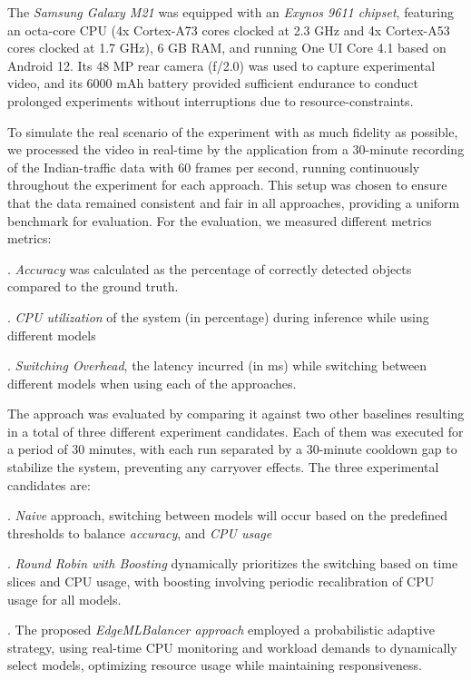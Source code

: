 The \textit{Samsung Galaxy M21} was equipped with an \textit{Exynos 9611 chipset}, featuring an octa-core CPU (4x Cortex-A73 cores clocked at 2.3 GHz and 4x Cortex-A53 cores clocked at 1.7 GHz), 6 GB RAM, and running One UI Core 4.1 based on Android 12. Its 48 MP rear camera (f/2.0) was used to capture experimental video, and its 6000 mAh battery provided sufficient endurance to conduct prolonged experiments without interruptions due to resource-constraints.

To simulate the real scenario of the experiment with as much fidelity as possible, we processed the video in real-time by the application from a 30-minute recording of the Indian-traffic data with 60 frames per second, running continuously throughout the experiment for each approach. This setup was chosen to ensure that the data remained consistent and fair in all approaches, providing a uniform benchmark for evaluation. For the evaluation, we measured different metrics metrics:

\smallskip
{}. \textit{Accuracy} was calculated as the percentage of correctly detected objects compared to the ground truth. 

\smallskip
{}. \textit{CPU utilization} of the system (in percentage) during inference while using different models 


\smallskip
{}. {\em Switching Overhead}, the latency incurred (in ms) while switching between different models when using each of the approaches. 

The approach was evaluated by comparing it against two other baselines resulting in a total of three different experiment candidates. Each of them was executed for a period of 30 minutes, with each run separated by a 30-minute cooldown gap to stabilize the system, preventing any carryover effects. The three experimental candidates are:

\smallskip
{}. \textit{Naive} approach, switching between models will occur based on the predefined thresholds to balance \textit{accuracy}, and \textit{CPU usage}

\smallskip
{}. \textit{Round Robin with Boosting} dynamically prioritizes the switching based on time slices and CPU usage, with boosting involving periodic recalibration of CPU usage for all models.

\smallskip
{}. The proposed \textit{EdgeMLBalancer approach} employed a probabilistic adaptive strategy, using real-time CPU monitoring and workload demands to dynamically select models, optimizing resource usage while maintaining responsiveness.

